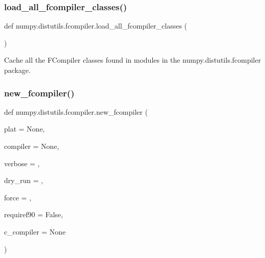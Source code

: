 \mbox{\label{namespacenumpy_1_1distutils_1_1fcompiler_aa27381238f64e75e39e7bea89394161e}} 
\subsubsection{\texorpdfstring{load\+\_\+all\+\_\+fcompiler\+\_\+classes()}{load\_all\_fcompiler\_classes()}}
{\footnotesize\ttfamily def numpy.\+distutils.\+fcompiler.\+load\+\_\+all\+\_\+fcompiler\+\_\+classes (\begin{DoxyParamCaption}{ }\end{DoxyParamCaption})}

\begin{DoxyVerb}Cache all the FCompiler classes found in modules in the
numpy.distutils.fcompiler package.
\end{DoxyVerb}
 \mbox{\label{namespacenumpy_1_1distutils_1_1fcompiler_acb202e9bb6aa4e32fdadae297a70dea7}} 
\subsubsection{\texorpdfstring{new\+\_\+fcompiler()}{new\_fcompiler()}}
{\footnotesize\ttfamily def numpy.\+distutils.\+fcompiler.\+new\+\_\+fcompiler (\begin{DoxyParamCaption}\item[{}]{plat = {\ttfamily None},  }\item[{}]{compiler = {\ttfamily None},  }\item[{}]{verbose = {},  }\item[{}]{dry\+\_\+run = {},  }\item[{}]{force = {},  }\item[{}]{requiref90 = {\ttfamily False},  }\item[{}]{c\+\_\+compiler = {\ttfamily None} }\end{DoxyParamCaption})}

